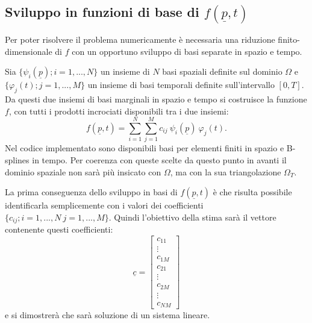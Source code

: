\documentclass[a4paper,11pt,twoside,openright]{book}							%
\begin{document}
\subsection*{Sviluppo in funzioni di base di $f(\underline p,t)$}

Per poter risolvere il problema numericamente è necessaria una riduzione finito-dimensionale di $f$ con un opportuno sviluppo di basi separate in spazio e tempo.

Sia $\{\psi_i(\underline p); i=1, ... , N\}$ un insieme di $N$ basi spaziali definite sul dominio $\Omega$ e $\{\varphi_j(t); j=1, ... , M\}$ un insieme di basi temporali definite sull'intervallo $[0,T]$. Da questi due insiemi di basi marginali in spazio e tempo si costruisce la funzione $f$, con tutti i prodotti incrociati disponibili tra i due insiemi:
\begin{equation} 
\label{eq:basisexp}
f(\underline p,t)=\sum_{i=1}^N \sum_{j=1}^M c_{ij}\ \psi_i(\underline p)\ \varphi_j(t) .
\end{equation}
Nel codice implementato sono disponibili basi per elementi finiti in spazio e B-splines in tempo. Per coerenza con queste scelte da questo punto in avanti il dominio spaziale non sarà più insicato con $\Omega$, ma con la sua triangolazione $\Omega_T$.

La prima conseguenza dello sviluppo in basi di $f(\underline p,t)$ è che risulta possibile identificarla semplicemente con i valori dei coefficienti $\{c_{ij}; i=1, ... , N\ j=1, ... , M\}$. Quindi l'obiettivo della stima sarà il vettore contenente questi coefficienti:
\begin{equation}
\underline c =
\begin{bmatrix}
c_{11}  \\
\vdots\\
c_{1M}  \\
c_{21}  \\
\vdots\\
c_{2M}  \\
\vdots\\
c_{NM}
\end{bmatrix}
\end{equation}
e si dimostrerà che sarà soluzione di un sistema lineare.
\end{document}

